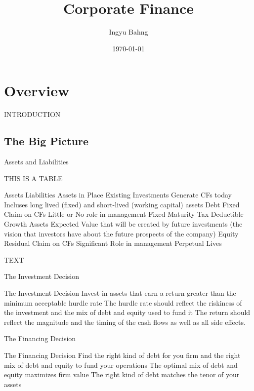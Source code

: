 \documentclass[10pt]{article}
\title{Corporate Finance}
\date{\today}
\author{Ingyu Bahng}
\begin{document}


\section{Overview}

  INTRODUCTION

  \subsection{The Big Picture}

    \begin{core}{Assets and Liabilities}

      THIS IS A TABLE

      Assets
      Liabilities
      Assets in Place
      Existing Investments
      Generate CFs today
      Incluses long lived (fixed) and short-lived (working capital) assets
      Debt
      Fixed Claim on CFs
      Little or No role in management
      Fixed Maturity
      Tax Deductible
      Growth Assets
      Expected Value that will be created by future investments (the vision that investors have about the future prospects of the company)
      Equity
      Residual Claim on CFs
      Significant Role in management
      Perpetual Lives

    \end{core}

    TEXT

    \begin{core}{The Investment Decision}

      The Investment Decision Invest in assets that earn a return greater than the minimum acceptable hurdle rate
      The hurdle rate should reflect the riskiness of the investment and the mix of debt and equity used to fund it
      The return should reflect the magnitude and the timing of the cash flows as well as all side effects.


    \end{core}

    \begin{core}{The Financing Decision}

      The Financing Decision Find the right kind of debt for you firm and the right mix of debt and equity to fund your operations
      The optimal mix of debt and equity maximizes firm value
      The right kind of debt matches the tenor of your assets


    \end{core}
\end{document}
